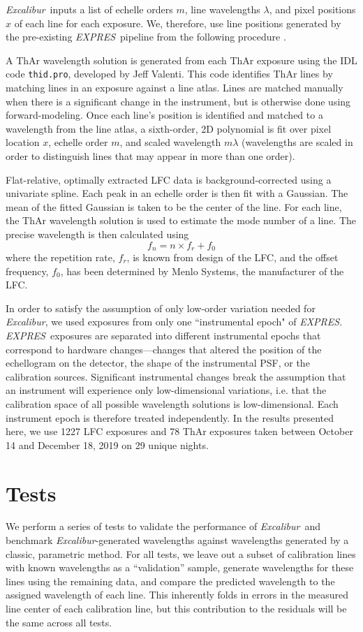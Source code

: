 \documentclass[modern]{aastex63}
\newcommand{\project}[1]{\textsl{#1}}
\newcommand{\name}{\project{Excalibur}}
\newcommand{\acronym}[1]{{\small{#1}}}
\newcommand{\expres}{\project{\acronym{EXPRES}}}
\begin{document}
 \name\ inputs a list of echelle orders $m$, line wavelengths $\lambda$, and pixel positions $x$ of each line for each exposure.  We, therefore, use line positions generated by the pre-existing \expres\ pipeline from the following procedure \citep{petersburg2020}.
 
 A ThAr wavelength solution is generated from each ThAr exposure using the IDL code \texttt{thid.pro}, developed by Jeff Valenti.  This code identifies ThAr lines by matching lines in an exposure against a line atlas.  Lines are matched manually when there is a significant change in the instrument, but is otherwise done using forward-modeling.  Once each line's position is identified and matched to a wavelength from the line atlas, a sixth-order, 2D polynomial is fit over pixel location $x$, echelle order $m$, and scaled wavelength $m\lambda$ (wavelengths are scaled in order to distinguish lines that may appear in more than one order).
 
 Flat-relative, optimally extracted LFC data is background-corrected using a univariate spline.  Each peak in an echelle order is then fit with a Gaussian.  The mean of the fitted Gaussian is taken to be the center of the line.  For each line, the ThAr wavelength solution is used to estimate the mode number of a line.  The precise wavelength is then calculated using
 \begin{equation}
 f_n = n \times  f_r + f_0
 \label{eq:lfc}
 \end{equation}
 where the repetition rate, $f_r$, is known from design of the LFC, and the offset frequency, $f_0$, has been determined by Menlo Systems, the manufacturer of the LFC.
 
In order to satisfy the assumption of only low-order variation needed for \name, we used exposures from only one ``instrumental epoch" of \expres.  \expres\ exposures are separated into different instrumental epochs that correspond to hardware changes---changes that altered the position of the echellogram on the detector, the shape of the instrumental PSF, or the calibration sources.  Significant instrumental changes break the assumption that an  instrument will experience only low-dimensional variations, i.e. that the calibration space of all possible wavelength solutions is low-dimensional.  Each instrument epoch is therefore treated independently.  In the results presented here, we use 1227 LFC exposures and 78 ThAr exposures taken between October 14 and December 18, 2019 on 29 unique nights.


\section{Tests}\label{sec:tests}
We perform a series of tests to validate the performance of \name\ and benchmark \name -generated wavelengths against wavelengths generated by a classic, parametric method.  For all tests, we leave out a subset of calibration lines with known wavelengths as a ``validation'' sample, generate wavelengths for these lines using the remaining data, and compare the predicted wavelength to the assigned wavelength of each line.  This inherently folds in errors in the measured line center of each calibration line, but this contribution to the residuals will be the same across all tests.
\end{document}

